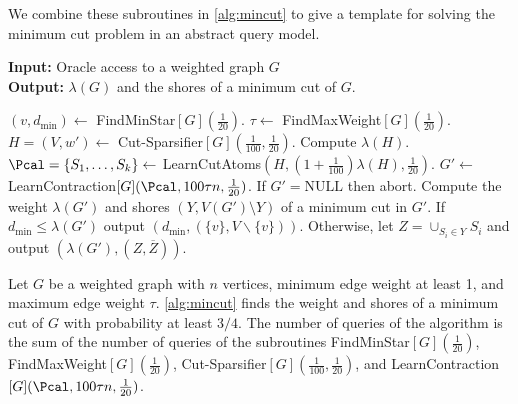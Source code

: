 We combine these subroutines in \cref{alg:mincut} to give a template for solving the minimum cut problem in an abstract query model.
\begin{algorithm}[H]
\caption{Query algorithm for minimum cut}
\label{alg:mincut}
 \hspace*{\algorithmicindent} \textbf{Input:} Oracle access to a weighted graph $G$ \\
 \hspace*{\algorithmicindent} \textbf{Output:} $\lambda(G)$ and the shores of a minimum cut of $G$.
\begin{algorithmic}[1]
\State $(v,d_{\min}) \gets$ FindMinStar$[G](\frac{1}{20})$.
\State $\tau \gets$ FindMaxWeight$[G](\frac{1}{20})$.
\State $H = (V,w') \gets$ Cut-Sparsifier$[G](\frac{1}{100}, \frac{1}{20})$.
\State Compute $\lambda(H)$.
\State $\Pcal = \{ S_1,\dots,S_k \} \gets$ LearnCutAtoms$(H,(1+\frac{1}{100})\lambda(H),\frac{1}{20})$.
\State $G' \gets$ LearnContraction$[G](\Pcal, 100 \tau n, \frac{1}{20})$.  If $G' = \mathrm{NULL}$ then abort.
\State Compute the weight $\lambda(G')$ and shores $(Y,V(G') \setminus Y)$ of a minimum cut in $G'$.
\State If $d_{\min} \le \lambda(G')$ output $(d_{\min},(\{v\},V\backslash\{v\}))$. Otherwise, let $Z = \cup_{S_i \in Y} S_i$ and output $(\lambda(G'), (Z, \overline{Z}))$.
\end{algorithmic}
\end{algorithm}

\begin{theorem}
\label{thm:rsw_alg}
Let $G$ be a weighted graph with $n$ vertices, minimum edge weight at least 1, and maximum edge weight $\tau$. 
\cref{alg:mincut} finds the weight and shores of a minimum cut of $G$ with probability at least $3/4$.  The number of queries of the algorithm is the sum of the number of queries 
of the subroutines FindMinStar$[G](\frac{1}{20})$, FindMaxWeight$[G](\frac{1}{20})$, Cut-Sparsifier$[G](\frac{1}{100}, \frac{1}{20})$, and LearnContraction$[G](\Pcal, 100 \tau n, \frac{1}{20})$.
\end{theorem}

